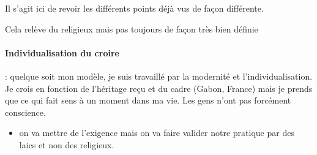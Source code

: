 Il s'agit ici de revoir les différents points déjà vus de façon différente.

\begin{Def}[Religiosité]
    Cela relève du religieux mais pas toujours de façon très bien définie
\end{Def}


  \paragraph{Individualisation du croire} : quelque soit mon modèle, je suis travaillé par la modernité et l'individualisation. Je crois en fonction de l'héritage reçu et du cadre (Gabon, France) mais je prends que ce qui fait sens à un moment dans ma vie. Les gens n'ont pas forcément conscience.

    \begin{itemize}
        \item  on va mettre de l'exigence mais on va faire valider notre pratique par des laics et non des religieux. 
    \end{itemize}
    
